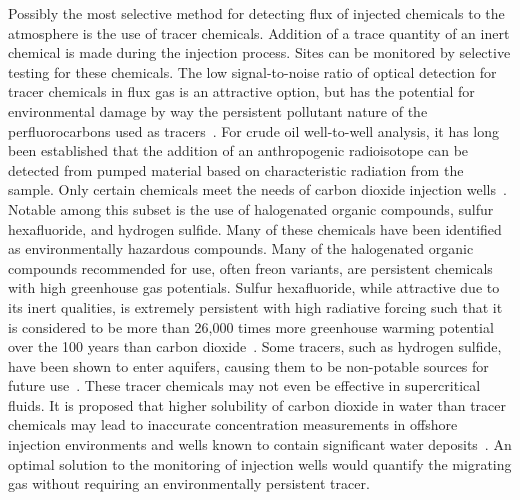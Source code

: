 \documentclass[journal]{IEEEtran}
\begin{document}
Possibly the most selective method for detecting flux of injected chemicals to the atmosphere is the use of tracer chemicals.  Addition of a trace quantity of an inert chemical is made during the injection process.  Sites can be monitored by selective testing for these chemicals.  The low signal-to-noise ratio of optical detection for tracer chemicals in flux gas is an attractive option, but has the potential for environmental damage by way the persistent pollutant nature of the perfluorocarbons used as tracers~\cite{wells_atmospheric_2013, wells_use_2007}.  For crude oil well-to-well analysis, it has long been established that the addition of an anthropogenic radioisotope can be detected from pumped material based on characteristic radiation from the sample.  Only certain chemicals meet the needs of carbon dioxide injection wells~\cite{craig_field_1985}.  Notable among this subset is the use of halogenated organic compounds, sulfur hexafluoride, and hydrogen sulfide.  Many of these chemicals have been identified as environmentally hazardous compounds.  Many of the halogenated organic compounds recommended for use, often freon variants, are persistent chemicals with high greenhouse gas potentials.  Sulfur hexafluoride, while attractive due to its inert qualities, is extremely persistent with high radiative forcing such that it is considered to be more than 26,000 times more greenhouse warming potential over the 100 years than carbon dioxide~\cite{myhre_2013:_2013}.  Some tracers, such as hydrogen sulfide, have been shown to enter aquifers, causing them to be non-potable sources for future use~\cite{apps_review_2006}.  These tracer chemicals may not even be effective in supercritical fluids.  It is proposed that higher solubility of carbon dioxide in water than tracer chemicals may lead to inaccurate concentration measurements in offshore injection environments and wells known to contain significant water deposits~\cite{vandeweijer_monitoring_2011}.  An optimal solution to the monitoring of injection wells would quantify the migrating gas without requiring an environmentally persistent tracer.  
\end{document}

